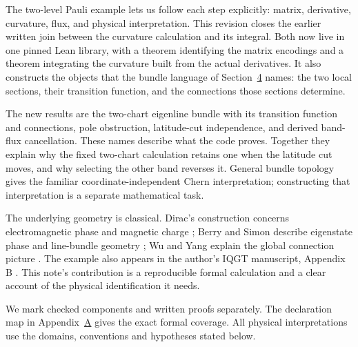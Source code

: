 \documentclass[11pt]{article}
\theoremstyle{definition}\newtheorem{definition}[theorem]{Definition}
\theoremstyle{remark}\newtheorem{remark}[theorem]{Remark}
\begin{document}
The two-level Pauli example lets us follow each step explicitly: matrix, derivative, curvature, flux, and physical interpretation. This revision closes the earlier written join between the curvature calculation and its integral. Both now live in one pinned Lean library, with a theorem identifying the matrix encodings and a theorem integrating the curvature built from the actual derivatives. It also constructs the objects that the bundle language of Section~\hyperref[sec:charts]{4} names: the two local sections, their transition function, and the connections those sections determine.

The new results are the two-chart eigenline bundle with its transition function and connections, pole obstruction, latitude-cut independence, and derived band-flux cancellation. These names describe what the code proves. Together they explain why the fixed two-chart calculation retains one when the latitude cut moves, and why selecting the other band reverses it. General bundle topology gives the familiar coordinate-independent Chern interpretation; constructing that interpretation is a separate mathematical task.

The underlying geometry is classical. Dirac's construction concerns electromagnetic phase and magnetic charge \cite{dirac}; Berry and Simon describe eigenstate phase and line-bundle geometry \cite{berry,simon}; Wu and Yang explain the global connection picture \cite{wuyang}. The example also appears in the author's IQGT manuscript, Appendix B \cite{iqgt}. This note's contribution is a reproducible formal calculation and a clear account of the physical identification it needs.

We mark checked components and written proofs separately. The declaration map in Appendix~\hyperref[sec:map]{A} gives the exact formal coverage. All physical interpretations use the domains, conventions and hypotheses stated below.
\end{document}
